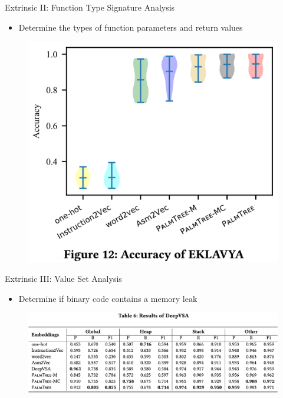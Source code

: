 \documentclass{beamer}
\begin{document}
\begin{frame}{Extrinsic II: Function Type Signature Analysis}
	
	\begin{itemize}
		\item Determine the types of function parameters and return values
	\end{itemize}

	\begin{figure}[h]
	\includegraphics[scale=.3]{images/EKLAVYA.png}
	\end{figure}
	
\end{frame}

\begin{frame}{Extrinsic III: Value Set Analysis}
	
	\begin{itemize}
		\item Determine if binary code contains a memory leak
	\end{itemize}

	\begin{figure}[h]
	\includegraphics[scale=.225]{images/DeepVSA.png}
	\end{figure}
	
\end{frame}
\end{document}
